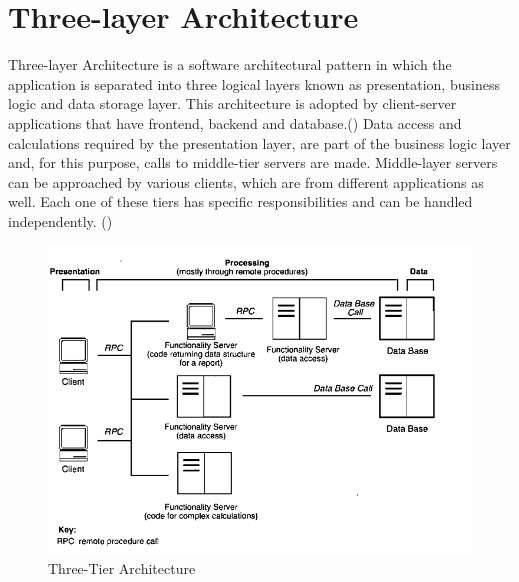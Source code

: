 
\section{Three-layer Architecture}

Three-layer Architecture is a software architectural pattern in which the application is separated into three logical layers known as presentation, business logic and data storage layer. This architecture is adopted by client-server applications that have frontend, backend and database.(\cite{Reference2}) Data access and calculations required by the presentation layer, are part of the business logic layer and, for this purpose, calls to middle-tier servers are made. Middle-layer servers can be approached by various clients, which are from different applications as well. Each one of these tiers has specific responsibilities and can be handled independently. (\cite{Reference5}) \par

\begin{figure}[h!]
	\begin{center}
		\includegraphics[scale=0.85]{images/three-layer-architecture-details.png}
	\end{center}
	\caption{Three-Tier Architecture}
\end{figure}

